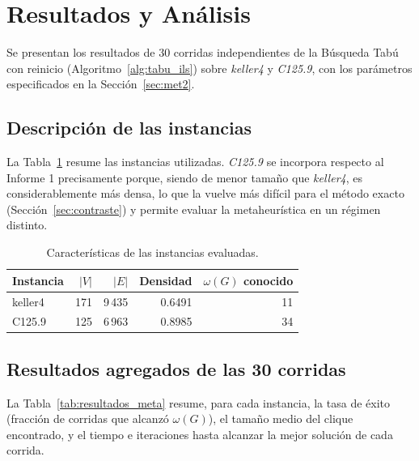 \section{Resultados y Análisis}\label{sec:resultados2}

Se presentan los resultados de 30 corridas independientes de la Búsqueda Tabú con reinicio (Algoritmo~\ref{alg:tabu_ils}) sobre \textit{keller4} y \textit{C125.9}, con los parámetros especificados en la Sección~\ref{sec:met2}.

\subsection{Descripción de las instancias}

La Tabla~\ref{tab:instancias2} resume las instancias utilizadas. \textit{C125.9} se incorpora respecto al Informe 1 precisamente porque, siendo de menor tamaño que \textit{keller4}, es considerablemente más densa, lo que la vuelve más difícil para el método exacto (Sección~\ref{sec:contraste}) y permite evaluar la metaheurística en un régimen distinto.

\begin{table}[H]
\centering
\caption{Características de las instancias evaluadas.}
\label{tab:instancias2}
\begin{tabular}{lrrrr}
\hline
\textbf{Instancia} & \textbf{$|V|$} & \textbf{$|E|$} & \textbf{Densidad} & \textbf{$\omega(G)$ conocido} \\
\hline
keller4 & 171 & 9\,435 & 0.6491 & 11 \\
C125.9  & 125 & 6\,963 & 0.8985 & 34 \\
\hline
\end{tabular}
\end{table}

\subsection{Resultados agregados de las 30 corridas}

La Tabla~\ref{tab:resultados_meta} resume, para cada instancia, la tasa de éxito (fracción de corridas que alcanzó $\omega(G)$), el tamaño medio del clique encontrado, y el tiempo e iteraciones hasta alcanzar la mejor solución de cada corrida.

